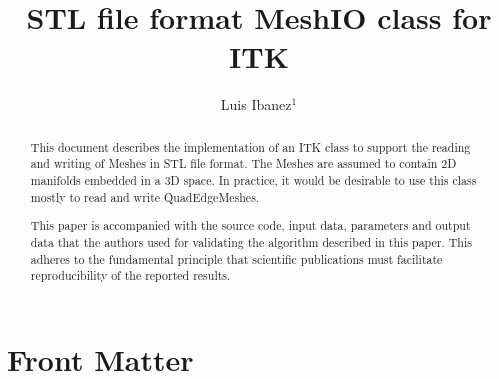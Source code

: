 \documentclass{InsightArticle}
\title{STL file format MeshIO class for ITK}
\author{Luis Ibanez$^{1}$}
\newcommand{\IJhandlerIDnumber}{3452}
\begin{document}
%
%
\IJhandlefooter{\IJhandlerIDnumber}




\ifpdf
\else
\fi


\maketitle


\ifhtml
\chapter*{Front Matter\label{front}}
\fi


\begin{abstract}
\noindent
This document describes the implementation of an ITK class to support the
reading and writing of Meshes in STL file format. The Meshes are assumed to
contain 2D manifolds embedded in a 3D space. In practice, it would be desirable
to use this class mostly to read and write QuadEdgeMeshes.

This paper is accompanied with the source code, input data, parameters and
output data that the authors used for validating the algorithm described in
this paper. This adheres to the fundamental principle that scientific
publications must facilitate reproducibility of the reported results.

\end{abstract}
\end{document}
